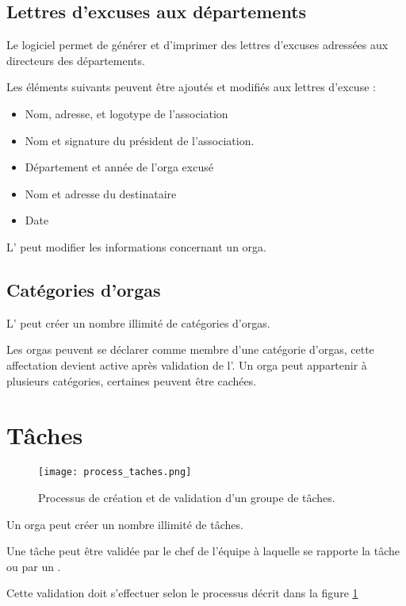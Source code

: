 \subsection{Lettres d'excuses aux départements}
Le logiciel permet de générer et d'imprimer des lettres d'excuses adressées aux directeurs des départements.

Les éléments suivants peuvent être ajoutés et modifiés aux lettres d'excuse : 
\begin{itemize}
 \item Nom, adresse, et logotype de l'association
\item Nom et signature du président de l'association.
\item Département et année de l'orga excusé
\item Nom et adresse du destinataire
\item Date
\end{itemize}


L' \oh{} peut modifier les informations concernant un orga.


\subsection{Catégories d'orgas}
L'\oh{} peut créer un nombre illimité de catégories d'orgas.

Les orgas peuvent se déclarer comme membre d'une catégorie d'orgas, cette affectation devient active après validation de l'\oh{}. Un orga peut appartenir à plusieurs catégories, certaines peuvent être cachées.

\section{Tâches}

\begin{figure}[h!t]
\centering
\texttt{[image: process\_taches.png]}
\label{fig:ptaches}
\caption{Processus de création et de validation d'un groupe de tâches.}
\end{figure}


Un orga peut créer un nombre illimité de tâches.

Une tâche peut être validée par le chef de l'équipe à laquelle se rapporte la tâche ou par un \oh{}.

Cette validation doit s'effectuer selon le processus décrit dans la figure \ref{fig:ptaches}

